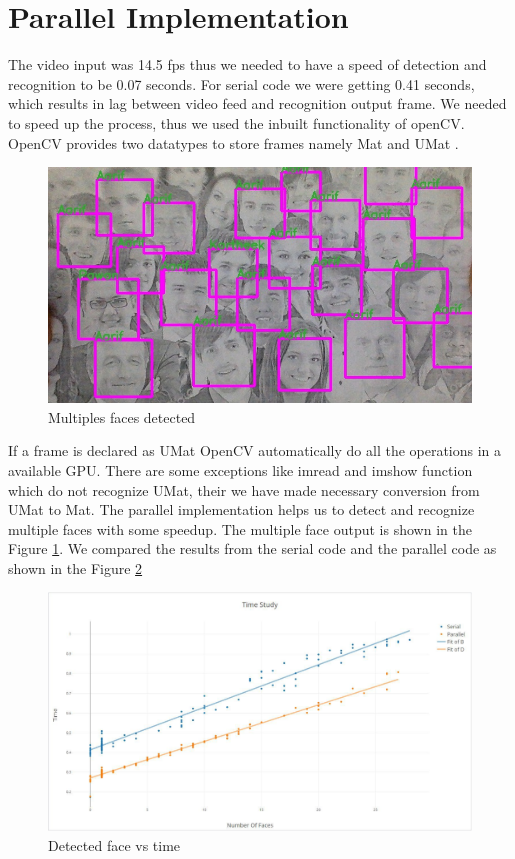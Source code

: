 \documentclass[conference]{IEEEtran}
\begin{document}
\section{Parallel Implementation}
The video input was 14.5 fps thus we needed to have a speed of detection and recognition to be 0.07 seconds. For serial code we were getting 0.41 seconds, which results in lag between video feed and recognition output frame. We needed to speed up the process, thus we used the inbuilt functionality of openCV. OpenCV provides two datatypes to store frames namely Mat and UMat \cite{opencl}. 
\begin{figure}[h!]
	\centering
	\includegraphics[scale=0.3]{./images/mul.jpg}
	\caption{Multiples faces detected}
	\label{mul}
\end{figure}
If a frame is declared as UMat OpenCV automatically do all the operations in a available GPU. There are some exceptions like imread and imshow function which do not recognize UMat, their we have made necessary conversion from UMat to Mat. The parallel implementation helps us to detect and recognize multiple faces with some speedup. The multiple face output is shown in the Figure \ref{mul}. We compared the results from the serial code and the parallel code as shown in the Figure \ref{plot}
\begin{figure}[h!]
	\centering
	\includegraphics[scale=0.3]{./images/plot.pdf}
	\caption{Detected face vs time}
	\label{plot}
\end{figure}
\end{document}
